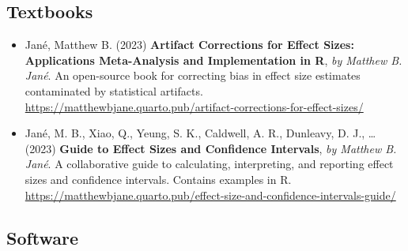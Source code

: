 \documentclass[
  letterpaper,
  DIV=11,
  numbers=noendperiod]{scrartcl}
\begin{document}
\hypertarget{textbooks}{%
\subsection{\texorpdfstring{ Textbooks}{ Textbooks}}\label{textbooks}}

\begin{itemize}
\item
  Jané, Matthew B. (2023) \textbf{Artifact Corrections for Effect Sizes:
  Applications Meta-Analysis and Implementation in R}, \emph{by Matthew
  B. Jané}. An open-source book for correcting bias in effect size
  estimates contaminated by statistical artifacts.
  \url{https://matthewbjane.quarto.pub/artifact-corrections-for-effect-sizes/}
\item
  Jané, M. B., Xiao, Q., Yeung, S. K., Caldwell, A. R., Dunleavy, D. J.,
  \ldots{} (2023) \textbf{Guide to Effect Sizes and Confidence
  Intervals}, \emph{by Matthew B. Jané}. A collaborative guide to
  calculating, interpreting, and reporting effect sizes and confidence
  intervals. Contains examples in R.
  \url{https://matthewbjane.quarto.pub/effect-size-and-confidence-intervals-guide/}
\end{itemize}

\hypertarget{software}{%
\subsection{\texorpdfstring{ Software}{ Software}}\label{software}}
\end{document}

